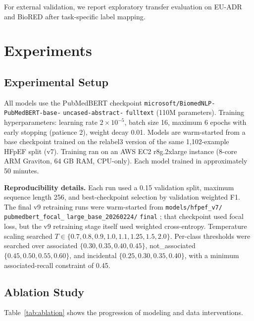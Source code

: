 \documentclass[sn-basic,pdflatex]{sn-jnl}
\newcommand{\RunInHeading}[1]{\par\smallskip\noindent\textbf{#1}\enspace\ignorespaces}
\newcommand{\ClassLabel}[1]{\mbox{\textup{#1}}}
\newcommand{\associated}{\ClassLabel{associated}}
\newcommand{\notassociated}{\ClassLabel{not\_associated}}
\newcommand{\incidental}{\ClassLabel{incidental}}
\newcommand{\PubMedBERTCheckpoint}{%
  \mbox{\texttt{microsoft/BiomedNLP-}}\allowbreak%
  \mbox{\texttt{PubMedBERT-base-}}\allowbreak%
  \mbox{\texttt{uncased-abstract-}}\allowbreak%
  \mbox{\texttt{fulltext}}%
}
\newcommand{\WarmStartCheckpoint}{%
  \mbox{\texttt{models/hfpef\_v7/}}\allowbreak%
  \mbox{\texttt{pubmedbert\_focal\_}}\allowbreak%
  \mbox{\texttt{large\_base\_20260224/}}\allowbreak%
  \mbox{\texttt{final}}%
}
\begin{document}
For external validation, we report exploratory transfer evaluation on EU-ADR \citep{vanmulligen2012euadr} and BioRED \citep{luo2022biored} after task-specific label mapping.


\section{Experiments}
\label{sec:experiments}

\subsection{Experimental Setup}

\begin{sloppypar}
All models use the PubMedBERT checkpoint \PubMedBERTCheckpoint{} (110M parameters).
Training hyperparameters: learning rate $2 \times 10^{-5}$, batch size 16, maximum 6 epochs with early stopping (patience 2), weight decay 0.01.
Models are warm-started from a base checkpoint trained on the relabel3 version of the same 1,102-example HFpEF split (v7).
Training ran on an AWS EC2 r8g.2xlarge instance (8-core ARM Graviton, 64 GB RAM, CPU-only). Each model trained in approximately 50 minutes.

\RunInHeading{Reproducibility details.}
Each run used a 0.15 validation split, maximum sequence length 256, and best-checkpoint selection by validation weighted F1.
The final v9 retraining runs were warm-started from \WarmStartCheckpoint{}; that checkpoint used focal loss, but the v9 retraining stage itself used weighted cross-entropy.
Temperature scaling searched $T \in \{0.7, 0.8, 0.9, 1.0, 1.1, 1.25, 1.5, 2.0\}$.
Per-class thresholds were searched over \associated{} $\{0.30, 0.35, 0.40, 0.45\}$, \notassociated{} $\{0.45, 0.50, 0.55, 0.60\}$, and \incidental{} $\{0.25, 0.30, 0.35, 0.40\}$, with a minimum associated-recall constraint of 0.45.
\end{sloppypar}

\subsection{Ablation Study}

Table~\ref{tab:ablation} shows the progression of modeling and data interventions.
\end{document}
